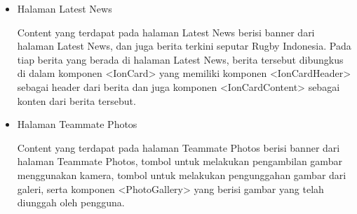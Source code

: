 \begin{itemize}
    \item Halaman Latest News

    Content yang terdapat pada halaman Latest News berisi banner dari halaman Latest News, dan juga berita terkini seputar Rugby Indonesia. Pada tiap berita yang berada di halaman Latest News, berita tersebut dibungkus di dalam komponen <IonCard> yang memiliki komponen <IonCardHeader> sebagai header dari berita dan juga komponen <IonCardContent> sebagai konten dari berita tersebut. 

    \item Halaman Teammate Photos

    Content yang terdapat pada halaman Teammate Photos berisi banner dari halaman Teammate Photos, tombol untuk melakukan pengambilan gambar menggunakan kamera, tombol untuk melakukan pengunggahan gambar dari galeri, serta komponen <PhotoGallery> yang berisi gambar yang telah diunggah oleh pengguna. 
\end{itemize}
